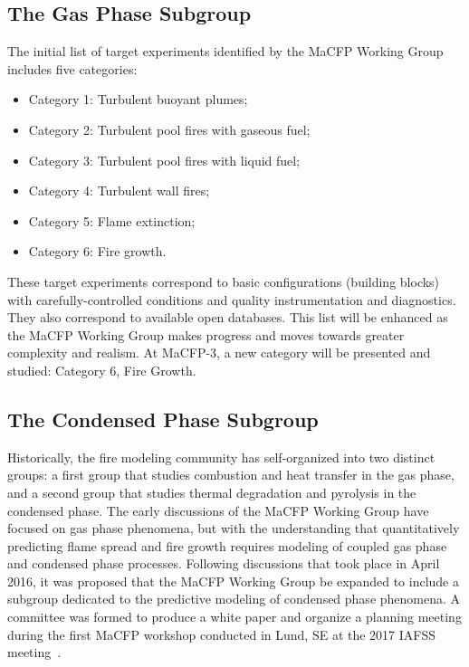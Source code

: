 \documentclass[12pt,demo]{article}
\begin{document}
\subsection{The Gas Phase Subgroup}
The initial list of target experiments identified by the MaCFP Working Group includes five categories:
\begin{itemize}[noitemsep]
 \item Category 1: Turbulent buoyant plumes;
 \item Category 2: Turbulent pool fires with gaseous fuel;
 \item Category 3: Turbulent pool fires with liquid fuel;
 \item Category 4: Turbulent wall fires;
 \item Category 5: Flame extinction;
 \item Category 6: Fire growth.
\end{itemize}
These target experiments correspond to basic configurations (building blocks) with carefully-controlled conditions and quality instrumentation and diagnostics. They also correspond to available open databases. This list will be enhanced as the MaCFP Working Group makes progress and moves towards greater complexity and realism. At MaCFP-3, a new category will be presented and studied: Category 6, Fire Growth.

\subsection{The Condensed Phase Subgroup}
Historically, the fire modeling community has self-organized into two distinct groups: a first group that studies combustion and heat transfer in the gas phase, and a second group that studies thermal degradation and pyrolysis in the condensed phase. The early discussions of the MaCFP Working Group have focused on gas phase phenomena, but with the understanding that quantitatively predicting flame spread and fire growth requires modeling of coupled gas phase and condensed phase processes. Following discussions that took place in April 2016, it was proposed that the MaCFP Working Group be expanded to include a subgroup dedicated to the predictive modeling of condensed phase phenomena. A committee was formed to produce a white paper and organize a planning meeting during the first MaCFP workshop conducted in Lund, SE at the 2017 IAFSS meeting~\cite{brown2018proceedings}. 
\end{document}
